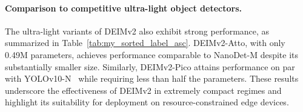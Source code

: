 \paragraph{Comparison to competitive ultra-light object detectors.} The ultra-light variants of DEIMv2 also exhibit strong performance, as summarized in Table~\ref{tab:my_sorted_label_asc}. DEIMv2-Atto, with only 0.49M parameters, achieves performance comparable to NanoDet-M despite its substantially smaller size. Similarly, DEIMv2-Pico attains performance on par with YOLOv10-N~\cite{wang2024yolov10} while requiring less than half the parameters. These results underscore the effectiveness of DEIMv2 in extremely compact regimes and highlight its suitability for deployment on resource-constrained edge devices.



